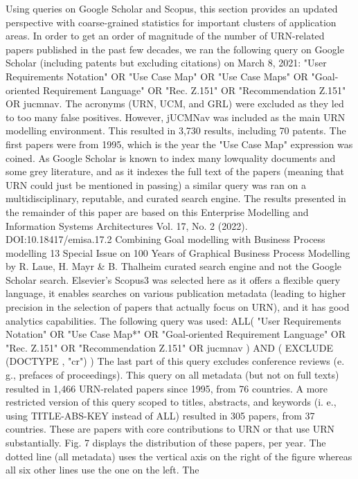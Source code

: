 Using queries on Google Scholar and Scopus,
this section provides an updated perspective with
coarse-grained statistics for important clusters of
application areas.
In order to get an order of magnitude of the
number of URN-related papers published in the
past few decades, we ran the following query on
Google Scholar (including patents but excluding
citations) on March 8, 2021:
"User Requirements Notation" OR "Use Case
Map" OR "Use Case Maps" OR "Goal-oriented Requirement Language" OR "Rec. Z.151" OR "Recommendation Z.151" OR jucmnav.
The acronyms (URN, UCM, and GRL) were
excluded as they led to too many false positives.
However, jUCMNav was included as the main
URN modelling environment. This resulted in
3,730 results, including 70 patents. The first
papers were from 1995, which is the year the "Use
Case Map" expression was coined.
As Google Scholar is known to index many lowquality documents and some grey literature, and as
it indexes the full text of the papers (meaning that
URN could just be mentioned in passing) a similar
query was ran on a multidisciplinary, reputable,
and curated search engine. The results presented
in the remainder of this paper are based on this
Enterprise Modelling and Information Systems Architectures
Vol. 17, No. 2 (2022). DOI:10.18417/emisa.17.2
Combining Goal modelling with Business Process modelling 13
Special Issue on 100 Years of Graphical Business Process Modelling by R. Laue, H. Mayr & B. Thalheim
curated search engine and not the Google Scholar
search. Elsevier’s Scopus3 was selected here
as it offers a flexible query language, it enables
searches on various publication metadata (leading
to higher precision in the selection of papers that
actually focus on URN), and it has good analytics
capabilities. The following query was used:
ALL( "User Requirements Notation" OR "Use
Case Map*" OR "Goal-oriented Requirement Language" OR "Rec. Z.151" OR "Recommendation
Z.151" OR jucmnav )
AND ( EXCLUDE (DOCTYPE , "cr") )
The last part of this query excludes conference
reviews (e. g., prefaces of proceedings). This
query on all metadata (but not on full texts) resulted in 1,466 URN-related papers since 1995,
from 76 countries. A more restricted version of
this query scoped to titles, abstracts, and keywords
(i. e., using TITLE-ABS-KEY instead of ALL) resulted in 305 papers, from 37 countries. These
are papers with core contributions to URN or that
use URN substantially.
Fig. 7 displays the distribution of these papers,
per year. The dotted line (all metadata) uses the
vertical axis on the right of the figure whereas
all six other lines use the one on the left. The
